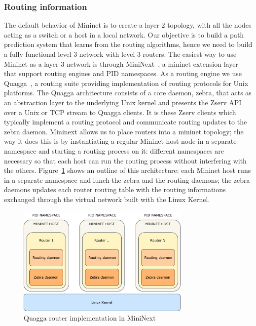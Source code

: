 \subsubsection{Routing information}
The default behavior of Mininet is to create a layer 2 topology, with all the nodes acting as a switch or a host in a local network. Our objective is to build a path prediction system that learns from the routing algorithms, hence we need to build a fully functional level 3 network with level 3 routers. The easiest way to use Mininet as a layer 3 network is through MiniNext~\cite{mininext}, a mininet extension layer that support routing engines and PID namespaces. As a routing engine we use Quagga~\cite{quagga}, a routing suite providing implementation of routing protocols for Unix platforms. The Quagga architecture consists of a core daemon, zebra, that acts as an abstraction layer to the underlying Unix kernel and presents the Zserv API over a Unix or TCP stream to Quagga clients. It is these Zserv clients which typically implement a routing protocol and communicate routing updates to the zebra daemon. Mininext allows us to place routers into a mininet topology; the way it does this is by instantiating  a regular Mininet host node in a separate namespace and starting a routing process on it: different namespaces are necessary so that each host can run the routing process without interfering with the others. Figure~\ref{fig:quagga_mininext} shows an outline of this architecture: each Mininet host runs in a separate namespace and lunch the zebra and the routing daemons; the zebra daemons updates each router routing table with the routing informations exchanged through the virtual network built with the Linux Kernel.
\begin{figure}
\centering
\includegraphics[width=0.75\textwidth]{img/quagga_mininext}
\caption{Quagga router implementation in MiniNext}
\label{fig:quagga_mininext}
\end{figure}

